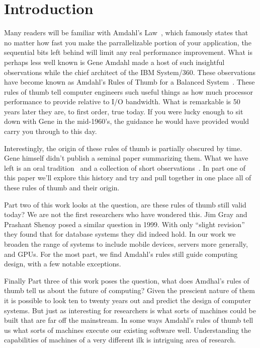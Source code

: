 \section{Introduction}

Many readers will be familiar with Amdahl's Law~\cite{FIXME}, which famously states that no matter how fast you make the parrallelizable portion of your application, the sequential bits left behind will limit any real performance improvement.  What is perhaps less well known is Gene Amdahl made a host of such insightful observations while the chief architect of the IBM System/360.  These observations have become known as Amdahl's Rules of Thumb for a Balanced System~\cite{FIXME}.  These rules of thumb tell computer engineers such useful things as how much processor performance to provide relative to I/O bandwidth.  What is remarkable is 50 years later they are, to first order, true today.  If you were lucky enough to sit down with Gene in the mid-1960's, the guidance he would have provided would carry you through to this day.

Interestingly, the origin of these rules of thumb is partially obscured by time.  Gene himself didn't publish a seminal paper summarizing them.  What we have left is an oral tradition~\cite{Amdahl-UMN-Interview} and a collection of short observations~\cite{FIXME}.  In part one of this paper we'll explore this history and try and pull together in one place all of these rules of thumb and their origin.

Part two of this work looks at the question, are these rules of thumb still valid today?  We are not the first researchers who have wondered this.  Jim Gray and Prashant Shenoy posed a similar question in 1999.  With only ``slight revision'' they found that for database systems they did indeed hold.  In our work we broaden the range of systems to include mobile devices, servers more generally, and GPUs.  For the most part, we find Amdahl's rules still guide computing design, with a few notable exceptions.
 
Finally Part three of this work poses the question, what does Amdhal's rules of thumb tell us about the future of computing?  Given the prescient nature of them it is possible to look ten to twenty years out and predict the design of computer systems.  But just as interesting for researchers is what sorts of machines could be built that are far off the mainstream.  In some ways Amdahl's rules of thumb tell us what sorts of machines execute our existing software well.  Understanding the capabilities of machines of a very different ilk is intriguing area of research.




